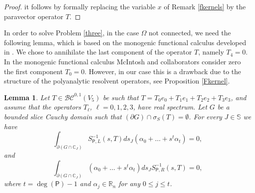 \documentclass[reqno,11pt]{amsart}
\numberwithin{equation}{section}
\newtheorem{lemma}[theorem]{Lemma}
\theoremstyle{definition}
\begin{document}
\begin{proof}
it follows by formally replacing the variable $x$ of Remark \ref{fkernels} by the paravector operator $T$.
\end{proof}
In order to solve Problem \ref{three}, in the case $ \Omega$ not connected, we need the following lemma, which is based on the monogenic functional calculus developed in \cite{J,JM}. We chose to annihilate the last component of the operator $T$, namely $T_4=0$. In the monogenic functional calculus  McIntosh and collaborators consider zero the first component $T_0=0$. However, in our case this is a drawback due to the structure of the polyanalytic resolvent operators, see Proposition \ref{Fkernel}.

\begin{lemma}
	\label{mono}
	Let $T \in \mathcal{BC}^{0,1}(V_5)$ be such that $T= T_0e_0+ T_1e_1+ T_2 e_2 + T_3 e_3$, and assume that the operators $T_{\ell}$, $\ell=0,1,2,3$, have real spectrum. Let $G$ be a bounded slice Cauchy domain such that $(\partial G) \cap \sigma_{S}(T)= \emptyset$. For every $J \in \mathbb{S}$ we have
	\begin{equation}
		\int_{\partial{(G \cap \mathbb{C}_J)}} S^{-1}_{\mathsf P,L}(s,T) ds_J (\alpha_0+\dots+ s^t\alpha_t)=0,
	\end{equation}
and
	\begin{equation}
	\label{right}
	\int_{\partial{(G \cap \mathbb{C}_J)}} (\alpha_0+\dots+ s^t\alpha_t) ds_J S^{-1}_{\mathsf P,R}(s,T)=0,
\end{equation}
where $t=\operatorname{deg}(\mathsf P)-1$ and $\alpha_j\in\mathbb R_n$ for any $0\leq j\leq t$.
\end{lemma}
\end{document}
